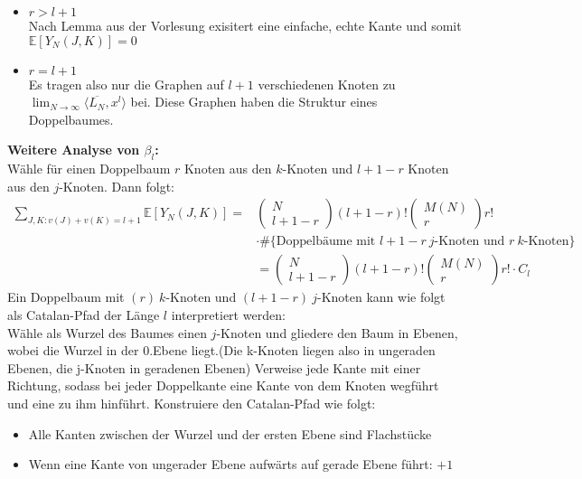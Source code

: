 \documentclass[a4paper, 11pt]{scrreprt}
\newenvironment{beweis}[1][Beweis]{\begin{trivlist}
	\item[\hskip \labelsep {\bfseries #1}]}
	{\end{trivlist}}
\newcommand{\EE}{\mathbb{E}}
\begin{document}
\begin{beweis}
\begin{itemize}
	\item \(r> l+1\) \\
		Nach Lemma aus der Vorlesung exisitert eine einfache, echte Kante und somit \(\EE[Y_N(J,K)]=0\)
	\item \(r=l+1\)\\
		Es tragen also nur die Graphen auf \(l+1\) verschiedenen Knoten zu \(\lim_{N\to\infty} \langle \overline{L_N}, x^l \rangle \) bei. Diese Graphen haben die Struktur eines Doppelbaumes.
\end{itemize}
\textbf{Weitere Analyse von \(\beta_l\):}\\
Wähle für einen Doppelbaum \(r\) Knoten aus den \(k\)-Knoten und \(l+1-r\) Knoten aus den \(j\)-Knoten. Dann folgt:
\begin{align*}
	\sum_{J,K: v(J)+v(K) = l+1} \EE[Y_N(J,K)] = &\begin{pmatrix} N\\ l+1-r\end{pmatrix} (l+1-r)! \begin{pmatrix} M(N)\\r\end{pmatrix} r! \\
	&\cdot \#\{\text{Doppelbäume mit }l+1-r\ j\text{-Knoten und } r\ k\text{-Knoten}\} \\
	&= \begin{pmatrix} N\\ l+1-r\end{pmatrix} (l+1-r)! \begin{pmatrix} M(N)\\r\end{pmatrix} r! \cdot C_l
\end{align*}
Ein Doppelbaum mit \((r)\  k\)-Knoten und \((l+1-r)\ j\)-Knoten kann wie folgt als Catalan-Pfad der Länge \(l\) interpretiert werden:\\
Wähle als Wurzel des Baumes einen \(j\)-Knoten und gliedere den Baum in Ebenen, wobei die Wurzel in der 0.Ebene liegt.(Die k-Knoten liegen also in ungeraden Ebenen, die j-Knoten in geradenen Ebenen) Verweise jede Kante mit einer Richtung, sodass bei jeder Doppelkante eine Kante von dem Knoten wegführt und eine zu ihm hinführt. Konstruiere den Catalan-Pfad wie folgt:\\
\begin{itemize}
	\item Alle Kanten zwischen der Wurzel und der ersten Ebene sind Flachstücke
	\item Wenn eine Kante von ungerader Ebene aufwärts auf gerade Ebene führt: \(+1\)

\end{itemize}
\end{beweis}
\end{document}
